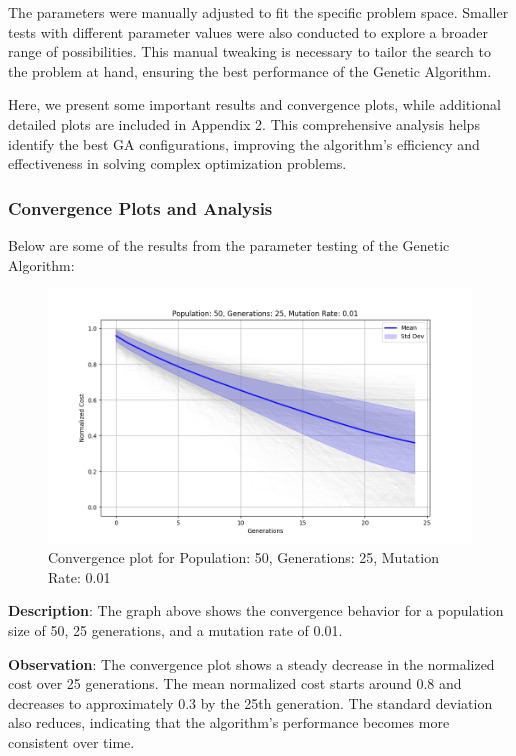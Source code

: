 \documentclass{article}
\begin{document}
    The parameters were manually adjusted to fit the specific problem space.
    Smaller tests with different parameter values were also conducted to explore a broader range of possibilities. This manual tweaking is necessary to tailor the search to the problem at hand, ensuring the best performance of the Genetic Algorithm.


    Here, we present some important results and convergence plots, while additional detailed plots are included in Appendix 2. This comprehensive analysis helps identify the best GA configurations, improving the algorithm's efficiency and effectiveness in solving complex optimization problems.

    \subsubsection{Convergence Plots and Analysis}

    Below are some of the results from the parameter testing of the Genetic Algorithm:

    \begin{figure}[H]
        \centering
        \includegraphics[width=\textwidth]{genetic_algorithm/Population_50_Generations_25_MutationRate_0.01}
        \caption{Convergence plot for Population: 50, Generations: 25, Mutation Rate: 0.01}
        \label{fig:ga_50_25_01}
    \end{figure}

    \textbf{Description}: The graph above shows the convergence behavior for a population size of 50, 25 generations, and a mutation rate of 0.01.

    \textbf{Observation}: The convergence plot shows a steady decrease in the normalized cost over 25 generations. The mean normalized cost starts around 0.8 and decreases to approximately 0.3 by the 25th generation. The standard deviation also reduces, indicating that the algorithm's performance becomes more consistent over time.
\end{document}
